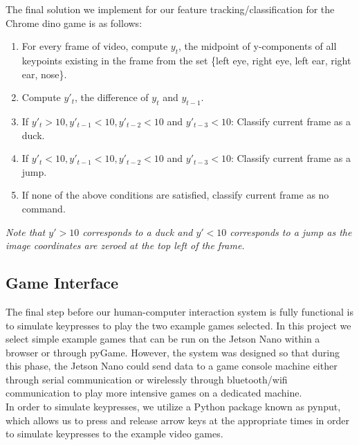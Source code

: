 \documentclass[10pt,twocolumn,letterpaper]{article}
\begin{document}
The final solution we implement for our feature tracking/classification for 
the Chrome dino game is as follows:

\begin{enumerate}
    \item For every frame of video, compute $y_t$, the midpoint of y-components 
    of all keypoints 
        existing in the frame from the set 
        \{left eye, right eye, left ear, right ear, nose\}.
    \item Compute $y'_t$, the difference of $y_t$ and $y_{t-1}$.
    \item If $y'_t > 10, y'_{t-1} < 10, y'_{t-2} < 10$ and $y'_{t-3} < 10$: 
        Classify current frame as a duck.
    \item If $y'_t < 10, y'_{t-1} < 10, y'_{t-2} < 10$ and $y'_{t-3} < 10$:
        Classify current frame as a jump.
    \item If none of the above conditions are satisfied, classify current frame as 
        no command.
\end{enumerate}

\textit{Note that $y' > 10$ corresponds to a duck and $y' < 10$ corresponds 
to a jump as the image coordinates are zeroed at the top left of the frame.}

\subsection{Game Interface}
The final step before our human-computer interaction system is fully functional 
is to simulate keypresses to play the two example games selected. In this project 
we select simple example games that can be run on the Jetson Nano within a browser 
or through pyGame. However, the system was designed so that during this phase, the 
Jetson Nano could send data to a game console machine either through serial 
communication or wirelessly through bluetooth/wifi communication to play more 
intensive games on a dedicated machine.\\

In order to simulate keypresses, we utilize a Python package known as pynput, 
which allows us to press and release arrow keys at the appropriate times in order 
to simulate keypresses to the example video games.
\end{document}
